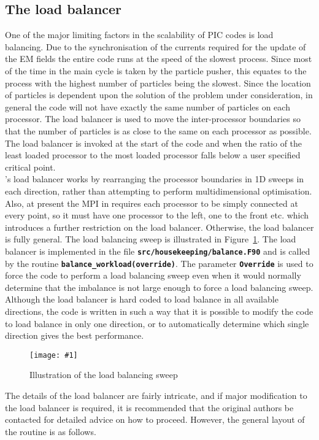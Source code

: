 \documentclass[12pt,a4paper]{article}
\newcommand{\inlinecode}[1]{{\color{warwickred} \bf\texttt{#1}}}
\newcommand{\EPOCH}{{\color{warwickdark}\fontfamily{phv}\selectfont{EPOCH}}}
\newcommand{\captionedimage}[3]
  {{\begin{figure}[hbt!]\centering\texttt{[image: \#1]}\caption{#3}\label{#2}
    \end{figure}}}
\begin{document}
\pagebreak

\subsection{The load balancer}
One of the major limiting factors in the scalability of PIC codes is load
balancing. Due to the synchronisation of the currents required for the update
of the EM fields the entire code runs at the speed of the slowest
process. Since most of the time in the main {\EPOCH} cycle is taken by the
particle pusher, this equates to the process with the highest number of
particles being the slowest. Since the location of particles is dependent upon
the solution of the problem under consideration, in general the code will not
have exactly the same number of particles on each processor. The load balancer
is used to move the inter-processor boundaries so that the number of particles
is as close to the same on each processor as possible. The load balancer is
invoked at the start of the code and when the ratio of the least loaded
processor to the most loaded processor falls below a user specified critical
point.\\

{\EPOCH}'s load balancer works by rearranging the processor boundaries in 1D
sweeps in each direction, rather than attempting to perform multidimensional
optimisation. Also, at present the MPI in {\EPOCH} requires each processor to be
simply connected at every point, so it must have one processor to the left, one
to the front etc. which introduces a further restriction on the load
balancer. Otherwise, the load balancer is fully general. The load balancing
sweep is illustrated in Figure~\ref{sweep}.
The load balancer is
implemented in the file \inlinecode{src/housekeeping/balance.F90} and is called
by the routine \inlinecode{balance\_workload(override)}. The parameter
\inlinecode{Override} is used to force the code to perform a load balancing
sweep even when it would normally determine that the imbalance is not large
enough to force a load balancing sweep. Although the load balancer is hard
coded to load balance in all available directions, the code is written in such
a way that it is possible to modify the code to load balance in only one
direction, or to automatically determine which single direction gives the best
performance.

\captionedimage{./images/sweep}{sweep}{Illustration of the load balancing sweep}

The details of the load balancer are fairly intricate, and if major
modification to the load balancer is required, it is recommended that the
original authors be contacted for detailed advice on how to proceed. However,
the general layout of the routine is as follows.
\end{document}
